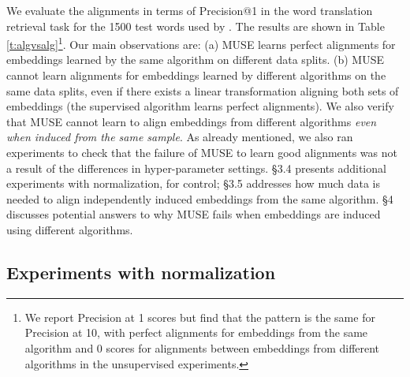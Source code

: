 \documentclass[11pt,a4paper]{article}
\begin{document}
We evaluate the alignments in terms of Precision@1 in the word translation retrieval task for the 1500 test words used by \citet{bojanowski2017}. The results are shown in Table \ref{t:algvsalg}\footnote{We report Precision at 1 scores but find that the pattern is the same for Precision at 10, with perfect alignments for embeddings from the same algorithm and 0 scores for alignments between embeddings from different algorithms in the unsupervised experiments.}. Our main observations are: (a) MUSE learns perfect alignments for embeddings learned by the same algorithm on different data splits. (b) MUSE cannot learn alignments for embeddings learned by different algorithms on the same data splits, even if there exists a linear transformation aligning both sets of embeddings (the supervised algorithm learns perfect alignments). We also verify that MUSE cannot learn to align embeddings from different algorithms {\em even when induced from the same sample}. As already mentioned, we also ran experiments to check that the failure of MUSE to learn good alignments was not a result of the differences in hyper-parameter settings. \S3.4 presents additional experiments with normalization, for control; \S3.5 addresses how much data is needed to align independently induced embeddings from the same algorithm. \S4 discusses potential answers to why MUSE fails when embeddings are induced using different algorithms. 






\subsection{Experiments with normalization}
\end{document}
